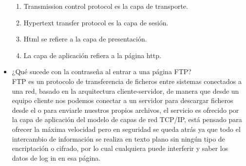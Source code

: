\documentclass{article}
\begin{document}
\begin{itemize}
\begin{enumerate}
    \item Transmission control protocol es la capa de transporte.
    \item Hypertext transfer protocol es la capa de sesión.
    \item Html se refiere a la capa de presentación.
    \item La capa de aplicación refiera a la página http.
\end{enumerate}
    \item ¿Qué sucede con la contraseña al entrar a una
página FTP?\\
\newline FTP es un protocolo de transferencia de ficheros entre sistemas conectados a una red, basado en la arquitectura cliente-servidor, de manera que desde un equipo cliente nos podemos conectar a un servidor para descargar ficheros desde el o para enviarle nuestros propios archivos, el servicio es ofrecido por la capa de aplicación del modelo de capas de red TCP/IP, está pensado para ofrecer la máxima velocidad pero en seguridad se queda atrás ya que todo el intercambio de información se realiza en texto plano sin ningún tipo de encriptación o cifrado, por lo cual cualquiera puede interferir y saber los datos de log in en esa página.
\end{itemize}
\end{document}
